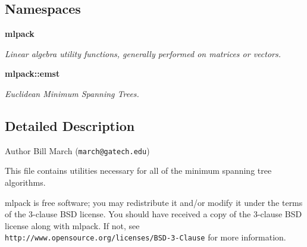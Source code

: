 \subsection*{Namespaces}
\begin{DoxyCompactItemize}
\item 
 \textbf{ mlpack}
\begin{DoxyCompactList}\small\item\em Linear algebra utility functions, generally performed on matrices or vectors. \end{DoxyCompactList}\item 
 \textbf{ mlpack\+::emst}
\begin{DoxyCompactList}\small\item\em Euclidean Minimum Spanning Trees. \end{DoxyCompactList}\end{DoxyCompactItemize}


\subsection{Detailed Description}
\begin{DoxyAuthor}{Author}
Bill March ({\tt march@gatech.\+edu})
\end{DoxyAuthor}
This file contains utilities necessary for all of the minimum spanning tree algorithms.

mlpack is free software; you may redistribute it and/or modify it under the terms of the 3-\/clause B\+SD license. You should have received a copy of the 3-\/clause B\+SD license along with mlpack. If not, see {\tt http\+://www.\+opensource.\+org/licenses/\+B\+S\+D-\/3-\/\+Clause} for more information. 